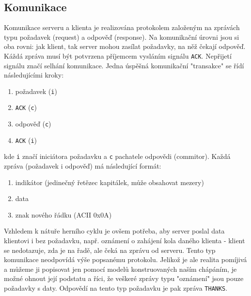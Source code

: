 \subsection{Komunikace}

Komunikace serveru a klienta je realizována protokolem založeným na zprávách typu požadavek (request) a odpověď (response). Na komunikační úrovni jsou si oba rovni: jak klient, tak server mohou zasílat požadavky, na něž čekají odpověď. Káždá zpráva musí být potvrzena příjemcem vysláním signálu \verb=ACK=. Nepřijetí signálu značí selhání komunikace. Jedna úspěšná komunikační "transakce" se řídí následujícími kroky:
\begin{enumerate}
    \item požadavek (\verb=i=)
    \item \verb=ACK= (\verb=c=)
    \item odpověď (\verb=c=)
    \item \verb=ACK= (\verb=i=)
\end{enumerate}
kde \verb=i= značí iniciátora požadavku a \verb=c= pachatele odpovědi (commitor). Každá zpráva (požadavek i odpověď) má následující formát:
\begin{enumerate}
    \item indikátor (jedinečný řetězec kapitálek, může obsahovat mezery)
    \item data
    \item znak nového řádku (ACII 0x0A)
\end{enumerate}

Vzhledem k nátuře herního cyklu je ovšem potřeba, aby server poslal data klientovi i bez požadavku, např. oznámení o zahájení kola daného klienta - klient se nedotazuje, zda je na řadě, ale čeká na zprávu od serveru. Tento typ komunikace neodpovídá výše popsanému protokolu. Jelikož je ale realita pomíjivá a můžeme ji popisovat jen pomocí modelů konstruovaných naším chápáním, je možné ohnout její podstatu a říci, že veškeré zprávy typu "oznámení" jsou pouze požadavky s daty. Odpovědí na tento typ požadavku je pak zpráva \verb=THANKS=.